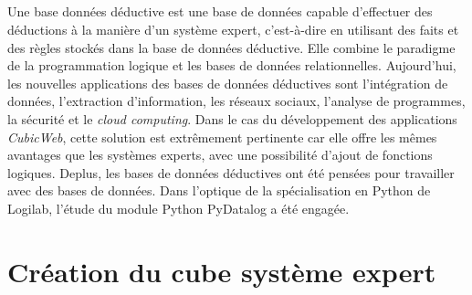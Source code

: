 \documentclass {report}
\begin{document}
\paragraph{}
Une base données déductive est une base de données capable d'effectuer des déductions à la manière d'un système expert, c'est-à-dire en utilisant des faits et des règles stockés dans la base de données déductive. Elle combine le paradigme de la programmation logique et les bases de données relationnelles. Aujourd'hui, les nouvelles applications des bases de données déductives sont l'intégration de données, l'extraction d'information, les réseaux sociaux, l'analyse de programmes, la sécurité et le \textit{cloud computing}\footnotemark[1]. Dans le cas du développement des applications \textit{CubicWeb}, cette solution est extrêmement pertinente car elle offre les mêmes avantages que les systèmes experts, avec une possibilité d'ajout de fonctions logiques. Deplus, les bases de données déductives ont été pensées pour travailler avec des bases de données. Dans l'optique de la spécialisation en Python de Logilab, l'étude du module Python PyDatalog a été engagée.



\chapter{Création du cube système expert}
\end{document}
